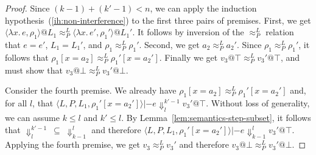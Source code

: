 \documentclass{article}
\makeatletter
\theoremstyle{definition}
\newcommand{\at}{\ensuremath{{\scriptstyle{@}}}}
\newcommand{\pc}{\ensuremath{{\mathit{pc}}}}
\makeatother
\begin{document}
\begin{proof}
  Since $(k-1) + (k'-1) < n$, we can apply the induction
  hypothesis~(\ref{ih:non-interference})
  to the first three pairs of premises.
  First, we get
  $\langle{\lambda{x}.\, e, \rho_1\rangle} \at L_1
  \approx^{L}_{P}
  \langle{\lambda{x}.\, e', \rho_1'\rangle} \at L_1'$.
  It follows by inversion of the $\approx^{L}_{P}$ relation that
  $e = e'$, $L_1 = L_1'$, and $\rho_1 \approx^{L}_{P} \rho_1'$.
  Second, we get $a_2 \approx^{L}_{P} a_2'$.
  Since $\rho_1 \approx^{L}_{P} \rho_1'$, it follows that
  $\rho_1[x = a_2] \approx^{L}_{P} \rho_1'[x = a_2']$.
  Finally we get $v_3 \at \top \approx^{L}_{P} v_3' \at \top$,
  and must show that $v_3 \at \bot \approx^{L}_{P} v_3' \at \bot$.

  Consider the fourth premise.
  We already have $\rho_1[x = a_2] \approx^{L}_{P} \rho_1'[x = a_2']$ and,
  for all $l$, that
  $\langle{L, P, L_1, \rho_1'[x = a_2']\rangle} |- e
  \Downarrow^{k'-1}_{l} v_3' \at \top$.
  Without loss of generality, we can assume $k \leq l$ and $k' \leq l$.
  By Lemma~\ref{lem:semantics-step-subset}, it follows that
  $\Downarrow^{k'-1}_{l}\ \subseteq\ \Downarrow^{l}_{k-1}$ and therefore
  $\langle{L, P, L_1, \rho_1'[x = a_2']\rangle} |- e \Downarrow^{l}_{k-1}
  v_3' \at \top$. Applying the fourth premise, we get
  $v_3 \approx^{L}_{P} v_3'$ and therefore
  $v_3 \at \bot \approx^{L}_{P} v_3' \at \bot$.

\end{proof}
\end{document}
